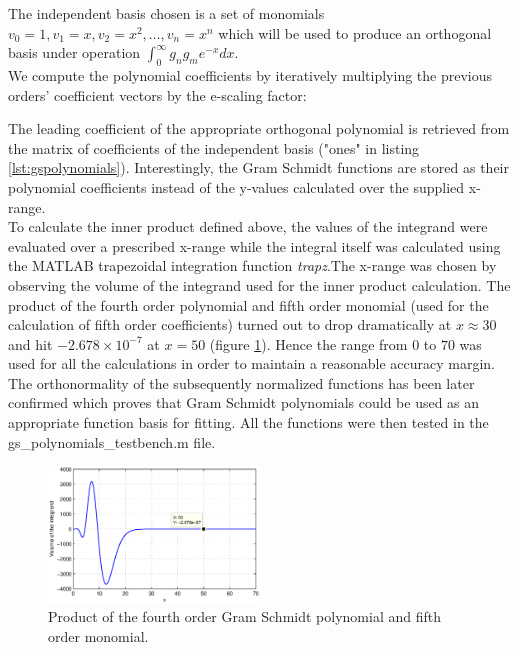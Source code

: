 \documentclass[a4paper]{article}
\numberwithin{equation}{section}
\begin{document}
The independent basis chosen is a set of monomials $v_0 = 1, v_1 = x, v_2 = x^2, \ldots, v_n=x^n$ which will be used to produce an orthogonal basis under operation $\int_{0}^{\infty} g_n g_m e^{-x} dx$.\\
We compute the polynomial coefficients by iteratively multiplying the previous orders' coefficient vectors by the e-scaling factor:



\noindent The leading coefficient of the appropriate orthogonal polynomial is retrieved from the matrix of coefficients of the independent basis ("ones" in listing \ref{lst:gspolynomials}). Interestingly, the Gram Schmidt functions are stored as their polynomial coefficients instead of the y-values calculated over the supplied x-range. \\

\noindent To calculate the inner product defined above, the values of the integrand were evaluated over a prescribed x-range while the integral itself was calculated using the MATLAB trapezoidal integration function \textit{trapz}.The x-range was chosen by observing the volume of the integrand used for the inner product calculation. The product of the fourth order polynomial and fifth order monomial (used for the calculation of fifth order coefficients) turned out to drop dramatically at $x \approx 30$ and hit $-2.678 \times 10^{-7}$ at $x=50$ (figure \ref{fig:integrand}). Hence the range from $0$ to $70$ was used for all the calculations in order to maintain a reasonable accuracy margin. The orthonormality of the subsequently normalized functions has been later confirmed which proves that Gram Schmidt polynomials could be used as an appropriate function basis for fitting. All the functions were then tested in the gs\_polynomials\_testbench.m file.

\begin{figure}
\centering
\includegraphics[width=0.5\textwidth]{integrand.eps}
\caption{\label{fig:integrand}Product of the fourth order Gram Schmidt polynomial and fifth order monomial.}
\end{figure}
\end{document}
